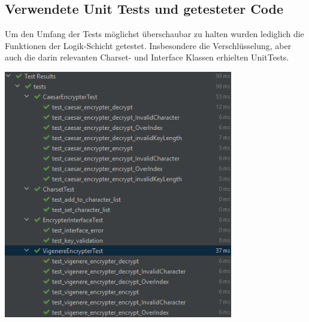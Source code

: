 \documentclass[12pt]{article}
\begin{document}
\subsection{Verwendete Unit Tests und getesteter Code}
Um den Umfang der Tests möglichst überschaubar zu halten wurden lediglich die Funktionen der Logik-Schicht getestet. Insbesondere die Verschlüsselung, aber auch die darin relevanten Charset- und Interface Klassen erhielten UnitTests.
\begin{center}
	\includegraphics[width=10cm]{bilder/Tests.png}
\end{center}
\end{document}
